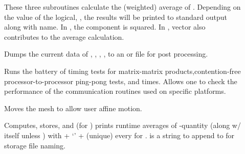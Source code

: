 \documentclass[letterpaper,10pt,english]{sphinxmanual}
\begin{document}

\begin{description}
\item[{}] \leavevmode
These three subroutines calculate the (weighted) average of . Depending on the value of the logical, , the results will be printed to standard output along with name. In , the  component is squared. In , vector  also contributes to the average calculation.

\item[{}] \leavevmode
Dumps the current data of , , , ,  to an  or  file for post processing.

\item[{}] \leavevmode
Runs the battery of timing tests for matrix-matrix products,contention-free processor-to-processor ping-pong tests, and  times. Allows one to check the performance of the communication routines used on specific platforms.

\item[{}] \leavevmode
Moves the mesh to allow user affine motion.

\item[{}] \leavevmode
Computes, stores, and (for ) prints runtime averages of -quantity  (along w/  itself unless ) with  + ‘’ + (unique)  every  for .  is a string to append to  for storage file naming.


\end{description}
\end{document}
